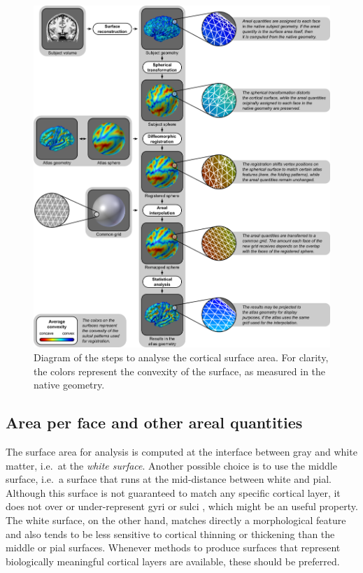 \begin{figure}[!p]  %
\centering
\includegraphics[width=14cm]{images/overview.png}
\caption[Overview of areal analyses.]{Diagram of the steps to analyse the cortical surface area. For clarity, the colors represent the convexity of the surface, as measured in the native geometry.}
\label{fig:areal:overview}
\end{figure}

\subsection{Area per face and other areal quantities}

The surface area for analysis is computed at the interface between gray and white matter, i.e.\ at the \emph{white surface}. Another possible choice is to use the middle surface, i.e.\ a surface that runs at the mid-distance between white and pial. Although this surface is not guaranteed to match any specific cortical layer, it does not over or under-represent gyri or sulci \citep{vanEssen2005}, which might be an useful property. The white surface, on the other hand, matches directly a morphological feature and also tends to be less sensitive to cortical thinning or thickening than the middle or pial surfaces. Whenever methods to produce surfaces that represent biologically meaningful cortical layers are available, these should be preferred.

